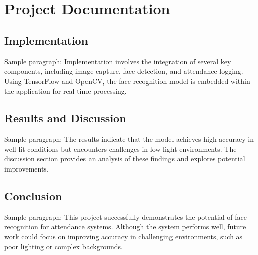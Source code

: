 \chapter{Project Documentation}
\section{Implementation}
Sample paragraph: Implementation involves the integration of several key components, including image capture, face detection, and attendance logging. Using TensorFlow and OpenCV, the face recognition model is embedded within the application for real-time processing.

\section{Results and Discussion}
Sample paragraph: The results indicate that the model achieves high accuracy in well-lit conditions but encounters challenges in low-light environments. The discussion section provides an analysis of these findings and explores potential improvements.

\section{Conclusion}
Sample paragraph: This project successfully demonstrates the potential of face recognition for attendance systems. Although the system performs well, future work could focus on improving accuracy in challenging environments, such as poor lighting or complex backgrounds.
